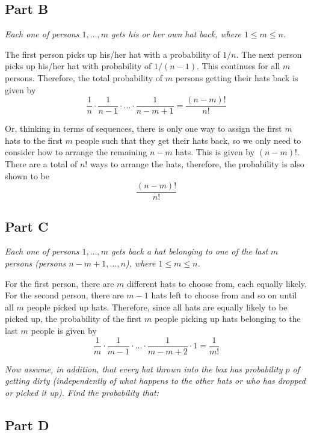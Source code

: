 \documentclass{article}
\begin{document}
\subsection*{Part B}

\textit{Each one of persons $ 1, \ldots, m $ gets his or her own hat back,
where $ 1 \leq m \leq n $.}

\bigbreak

The first person picks up his/her hat with a probability of $ 1 / n $. The
next person picks up his/her hat with probability of $ 1 / (n - 1) $. This
continues for all $ m $ persons. Therefore, the total probability of $ m $
persons getting their hats back is given by
$$ \frac{1}{n} \cdot \frac{1}{n - 1} \cdot \ldots \cdot \frac{1}{n - m + 1} =
\frac{(n - m)!}{n!} $$

Or, thinking in terms of sequences, there is only one way to assign the first
$ m $ hats to the first $ m $ people such that they get their hats back, so
we only need to consider how to arrange the remaining $ n - m $ hats. This is
given by $ (n - m)! $. There are a total of $ n! $ ways to arrange the hats,
therefore, the probability is also shown to be
$$ \frac{(n - m)!}{n!} $$

\subsection*{Part C}

\textit{Each one of persons $ 1, \ldots, m $ gets back a hat belonging to one
of the last $ m $ persons (persons $ n - m + 1, \ldots, n $), where $ 1 \leq 
m \leq n $.}

\bigbreak

For the first person, there are $ m $ different hats to choose from, each
equally likely. For the second person, there are $ m - 1 $ hats left to
choose from and so on until all $ m $ people picked up hats. Therefore, since
all hats are equally likely to be picked up, the probability of the first $ m
$ people picking up hats belonging to the last $ m $ people is given by
$$ \frac{1}{m} \cdot \frac{1}{m - 1} \cdot \ldots \cdot \frac{1}{m - m + 2}
\cdot 1 = \frac{1}{m!} $$

\bigbreak

\textit{Now assume, in addition, that every hat thrown into the box has
probability $ p $ of getting dirty (independently of what happens to the
other hats or who has dropped or picked it up). Find the probability that:}

\subsection*{Part D}
\end{document}
